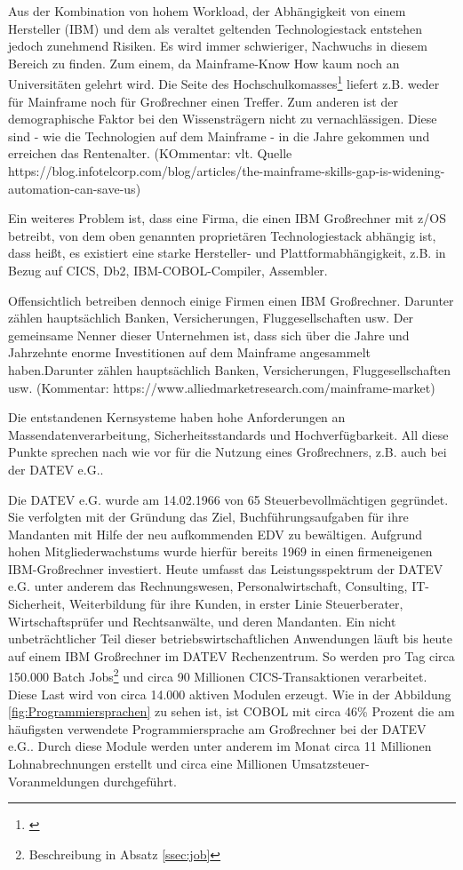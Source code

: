 Aus der Kombination von hohem Workload, der Abhängigkeit von einem Hersteller (IBM) und dem als veraltet geltenden Technologiestack entstehen jedoch zunehmend Risiken.
Es wird immer schwieriger, Nachwuchs in diesem Bereich zu finden.
Zum einem, da Mainframe-Know How kaum noch an Universitäten gelehrt wird.
Die Seite des Hochschulkomasses\footnote{\cite{internetagenturKolnFrankfurtsunzinetTYPO3Programmmierung.}} liefert z.B. weder für \glqq Mainframe\grqq{} noch für \glqq Großrechner\grqq{} einen Treffer.
Zum anderen ist der demographische Faktor bei den Wissensträgern nicht zu vernachlässigen. Diese sind - wie die Technologien auf dem Mainframe - in die Jahre gekommen und erreichen das Rentenalter. (KOmmentar: vlt. Quelle https://blog.infotelcorp.com/blog/articles/the-mainframe-skills-gap-is-widening-automation-can-save-us) 

Ein weiteres Problem ist, dass eine Firma, die einen IBM Großrechner mit z/OS betreibt, von dem oben genannten proprietären Technologiestack abhängig ist, dass heißt, es existiert eine starke Hersteller- und Plattformabhängigkeit, z.B. in Bezug auf CICS, Db2, IBM-COBOL-Compiler, Assembler.

Offensichtlich betreiben dennoch einige Firmen einen IBM Großrechner.
Darunter zählen hauptsächlich Banken, Versicherungen, Fluggesellschaften usw. 
Der gemeinsame Nenner dieser Unternehmen ist, dass sich über die Jahre und Jahrzehnte enorme Investitionen auf dem Mainframe angesammelt haben.Darunter zählen hauptsächlich Banken, Versicherungen, Fluggesellschaften usw. (Kommentar: https://www.alliedmarketresearch.com/mainframe-market) 

Die entstandenen Kernsysteme haben hohe Anforderungen an Massendatenverarbeitung, Sicherheitsstandards und Hochverfügbarkeit.
All diese Punkte sprechen nach wie vor für die Nutzung eines Großrechners, z.B. auch bei der DATEV e.G..
\cite{IBM.2014}

Die DATEV e.G. wurde am 14.02.1966 von 65 Steuerbevollmächtigen gegründet.
Sie verfolgten mit der Gründung das Ziel, Buchführungsaufgaben für ihre Mandanten mit Hilfe der neu aufkommenden EDV zu bewältigen.
Aufgrund hohen Mitgliederwachstums wurde hierfür bereits 1969 in einen firmeneigenen IBM-Großrechner investiert.\cite{DATEVeG.2017}
Heute umfasst das Leistungsspektrum der DATEV e.G. unter anderem das Rechnungswesen, Personalwirtschaft, Consulting, IT-Sicherheit, Weiterbildung für ihre Kunden, in erster Linie Steuerberater, Wirtschaftsprüfer und Rechtsanwälte, und deren Mandanten.
Ein nicht unbeträchtlicher Teil dieser betriebswirtschaftlichen Anwendungen läuft bis heute auf einem IBM Großrechner im DATEV Rechenzentrum.
So werden pro Tag circa 150.000 Batch Jobs\footnote{Beschreibung in Absatz \ref{ssec:job}} und circa 90 Millionen CICS-Transaktionen verarbeitet.
Diese Last wird von circa 14.000 aktiven Modulen erzeugt.
Wie in der Abbildung \ref{fig:Programmiersprachen} zu sehen ist, ist COBOL mit circa 46\% Prozent die am häufigsten verwendete Programmiersprache am Großrechner bei der DATEV e.G..
Durch diese Module werden unter anderem im Monat circa 11 Millionen Lohnabrechnungen erstellt und circa eine Millionen Umsatzsteuer-Voranmeldungen durchgeführt.

